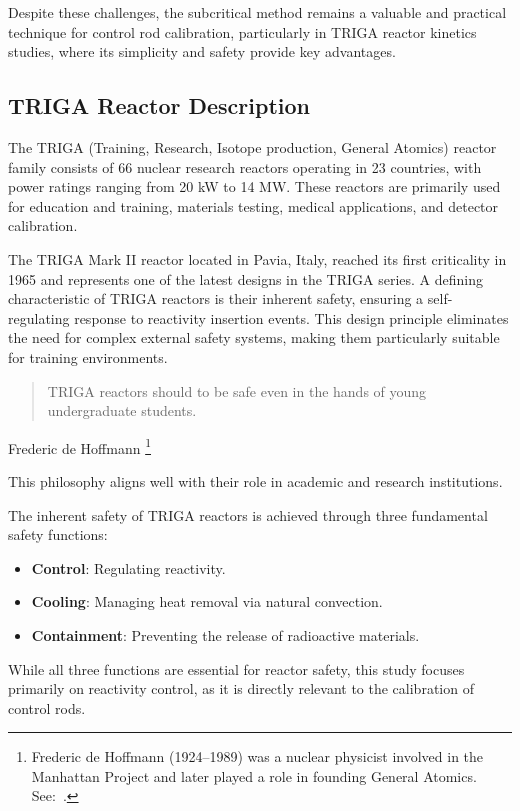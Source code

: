 Despite these challenges, the subcritical method remains a valuable and practical technique for control rod calibration, particularly in TRIGA reactor kinetics studies, where its simplicity and safety provide key advantages.

\newpage
\subsection{TRIGA Reactor Description}

The TRIGA (Training, Research, Isotope production, General Atomics) reactor family consists of 66 nuclear research reactors operating in 23 countries, with power ratings ranging from 20 kW to 14 MW. These reactors are primarily used for education and training, materials testing, medical applications, and detector calibration.

The TRIGA Mark II reactor located in Pavia, Italy, reached its first criticality in 1965 and represents one of the latest designs in the TRIGA series. A defining characteristic of TRIGA reactors is their inherent safety, ensuring a self-regulating response to reactivity insertion events. This design principle eliminates the need for complex external safety systems, making them particularly suitable for training environments.

\blockquote{{TRIGA reactors} should to be safe even in the hands of young undergraduate students.}{Frederic de Hoffmann \footnote{Frederic de Hoffmann (1924–1989) was a nuclear physicist involved in the Manhattan Project and later played a role in founding General Atomics. See:~\parencite{DeHoffmann1989}.}}

This philosophy aligns well with their role in academic and research institutions.

The inherent safety of TRIGA reactors is achieved through three fundamental safety functions:
\begin{itemize}
    \item \textbf{Control}: Regulating reactivity.
    \item \textbf{Cooling}: Managing heat removal via natural convection.
    \item \textbf{Containment}: Preventing the release of radioactive materials.
\end{itemize}

While all three functions are essential for reactor safety, this study focuses primarily on reactivity control, as it is directly relevant to the calibration of control rods.


